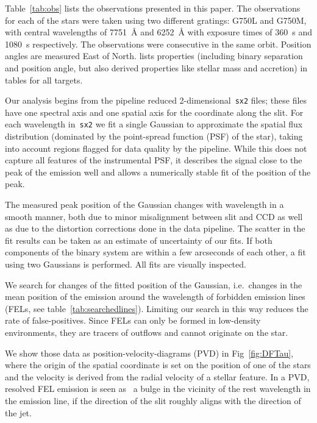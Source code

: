 \documentclass[twocolumn]{aastex62}
\begin{document}
Table~\ref{tab:obs} lists the observations presented in this paper. The observations for each of the stars were taken using two different gratings: G750L and G750M, with central wavelengths of 7751~\AA{} and 6252~\AA{} with exposure times of 360~s and 1080~s respectively. The observations were consecutive in the same orbit. Position angles are measured East of North. \citet{2003ApJ...583..334H} lists properties (including binary separation and position angle, but also derived properties like stellar mass and accretion) in tables for all targets.

Our analysis begins from the pipeline reduced
2-dimensional~\texttt{sx2} files; these files have one spectral axis and
one spatial axis for the coordinate along the slit. For each wavelength
in~\texttt{sx2} we fit a single Gaussian to approximate the spatial flux distribution (dominated by the point-spread function (PSF) of the star), taking into account regions
flagged for data quality by the pipeline. While this does not capture
all features of the instrumental PSF, it describes the signal close to the
peak of the emission well and allows a numerically stable fit of the
position of the peak.

The measured peak position  of the Gaussian changes with
wavelength in a smooth manner, both due to minor misalignment between slit and CCD as well as due to the distortion corrections done in the data
pipeline. The scatter in the fit results can be
taken as an estimate of uncertainty of our fits.
If both components of the binary system are within a few arcseconds of
each other, a fit using two Gaussians is performed. All fits are
visually inspected. 

We search for changes
of the fitted position of the Gaussian, i.e.\ changes in the mean
position of the emission around the wavelength of forbidden emission
lines (FELs, see table~\ref{tab:searchedlines}). Limiting our search in this way reduces the
rate of false-positives. Since FELs can only be formed in low-density
environments, they are tracers of outflows and cannot originate on the
star.

We show those data as position-velocity-diagrams (PVD) in Fig~\ref{fig:DFTau}, where the
origin of the spatial coordinate is set on the position of one of the stars and the velocity is derived from the radial velocity  of
a stellar feature. In a PVD, resolved
FEL emission is seen as~ a bulge in the vicinity of the rest wavelength
in the emission line, if the direction of the slit roughly aligns with
the direction of the jet.
\end{document}
